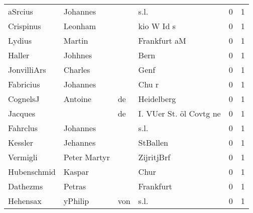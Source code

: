 \begin{tabular}{llllrr}
                  aSrcius &                           Johannes &             &                                        s.l. &          0 &         1 \\
                Crispinus &                            Leonham &             &                                  kio W Id s &          0 &         1 \\
                   Lydius &                             Martin &             &                                Frankfurt aM &          0 &         1 \\
                   Haller &                            Johhnes &             &                                        Bern &          0 &         1 \\
              JonvilliArs &                            Charles &             &                                        Genf &          0 &         1 \\
                Fabricius &                           Johannes &             &                                       Chu r &          0 &         1 \\
                 CognelsJ &                            Antoine &          de &                                  Heidelberg &          0 &         1 \\
                  Jacques &                                    &          de &                     I. VUer St. öl Covtg ne &          0 &         1 \\
                 Fahrclus &                           Johannes &             &                                        s.l. &          0 &         1 \\
                  Kessler &                           Jehannes &             &                                    StBallen &          0 &         1 \\
                 Vermigli &                       Peter Martyr &             &                                  ZijritjBrf &          0 &         1 \\
              Hubenschmid &                             Kaspar &             &                                        Chur &          0 &         1 \\
                 Dathezms &                             Petras &             &                                   Frankfurt &          0 &         1 \\
                 Hehensax &                            yPhilip &         von &                                        s.l. &          0 &         1 \\

\end{tabular}
